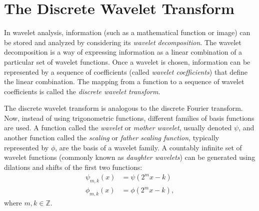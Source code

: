 
\section*{The Discrete Wavelet Transform} %


In wavelet analysis, information (such as a mathematical function or image) can be stored and analyzed by considering its \emph{wavelet decomposition}.
The wavelet decomposition is a way of expressing information as a linear combination of a particular set of wavelet functions.
Once a wavelet is chosen, information can be represented by a sequence of coefficients (called \emph{wavelet coefficients}) that define the linear combination.
The mapping from a function to a sequence of wavelet coefficients is called the \emph{discrete wavelet transform}.

The discrete wavelet transform is analogous to the discrete Fourier transform.
Now, instead of using trigonometric functions, different families of basis functions are used.
A function called the \emph{wavelet} or \emph{mother wavelet}, usually denoted $\psi$, and another function called the \emph{scaling} or \emph{father scaling function}, typically represented by $\phi$,
are the basis of a wavelet family.
A countably infinite set of wavelet functions (commonly known as \emph{daughter wavelets}) can be generated using dilations and shifts of the first two functions:
\begin{align*}
\psi_{m,k}(x) &= \psi(2^mx - k)\\
\phi_{m,k}(x) &= \phi(2^mx - k),
\end{align*}
where $m,k \in \mathbb{Z}$.

